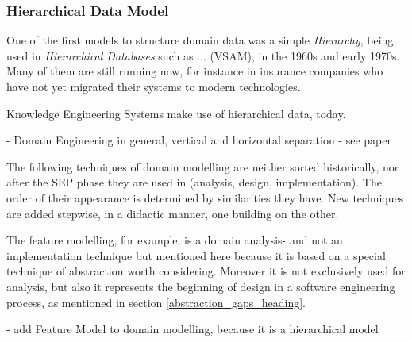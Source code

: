 %
%
%
%
%
%
%

\subsubsection{Hierarchical Data Model}
\label{hierarchical_data_model_heading}

One of the first models to structure domain data was a simple \emph{Hierarchy},
being used in \emph{Hierarchical Databases} such as ... (VSAM),
in the 1960s and early 1970s. Many of them are still running now,
for instance in insurance companies who have not yet migrated their
systems to modern technologies.

Knowledge Engineering Systems make use of hierarchical data, today.

- Domain Engineering in general, vertical and horizontal separation
- see \cite{inpulse} paper

The following techniques of domain modelling are neither sorted historically,
nor after the SEP phase they are used in (analysis, design, implementation).
The order of their appearance is determined by similarities they have. New
techniques are added stepwise, in a didactic manner, one building on the
other.

The feature modelling, for example, is a domain analysis- and not an
implementation technique but mentioned here because it is based on a special
technique of abstraction worth considering. Moreover it is not exclusively used
for analysis, but also it represents the beginning of design in a software
engineering process, as mentioned in section \ref{abstraction_gaps_heading}.

- add Feature Model to domain modelling, because it is a hierarchical model
